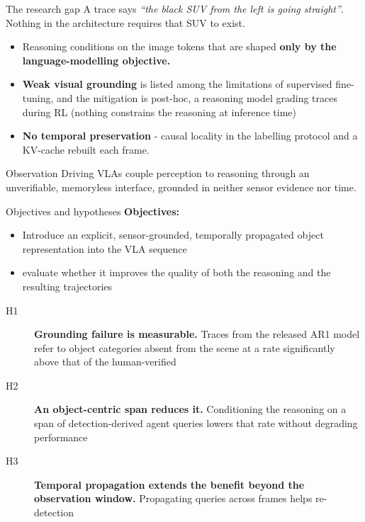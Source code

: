 \documentclass[aspectratio=169,11pt,t]{beamer}
\newcommand{\refcite}[1]{\textcolor{tuered}{\scriptsize\cite{#1}}}
\begin{document}
\begin{frame}{The research gap}
  \small
  A trace says \emph{``the black SUV from the left is going
  straight''}\refcite{NVIDIA2025AlpamayoR1}. Nothing in the architecture
  requires that SUV to exist.

  \begin{itemize}
    \item Reasoning conditions on the image tokens that are shaped \textbf{only by the
      language-modelling objective.} 
    \item \textbf{Weak visual grounding} is listed among the limitations of supervised
      fine-tuning, and the \alert{mitigation is post-hoc}, a reasoning model grading
      traces during RL (nothing constrains the reasoning at inference time)
    \item \textbf{No temporal preservation} - causal locality in the labelling protocol
      and a KV-cache rebuilt each frame.
  \end{itemize}

  \begin{block}{Observation}
    Driving VLAs couple perception to reasoning through an \alert{unverifiable},
    \alert{memoryless interface}, grounded in neither sensor evidence nor time.
  \end{block}
\end{frame}

\begin{frame}{Objectives and hypotheses}
  \small
  \textbf{Objectives: }
  \begin{itemize}
  \item Introduce an explicit, sensor-grounded, temporally propagated object
  representation into the VLA sequence
  \item evaluate whether it improves the
  quality of both the reasoning and the resulting trajectories
  \end{itemize}

  \vspace{0.4em}
  \begin{description}
    \item[H1] \textbf{Grounding failure is measurable.}
      Traces from the released AR1 model refer to object categories absent from
      the scene at a rate significantly above that of the human-verified
    \item[H2] \textbf{An object-centric span reduces it.} Conditioning the
      reasoning on a span of detection-derived agent queries lowers that rate
      without degrading performance
    \item[H3] \textbf{Temporal propagation extends the benefit beyond the
      observation window.} Propagating queries across frames helps re-detection
  \end{description}

  \vspace{0.3em}
\end{frame}
\end{document}
